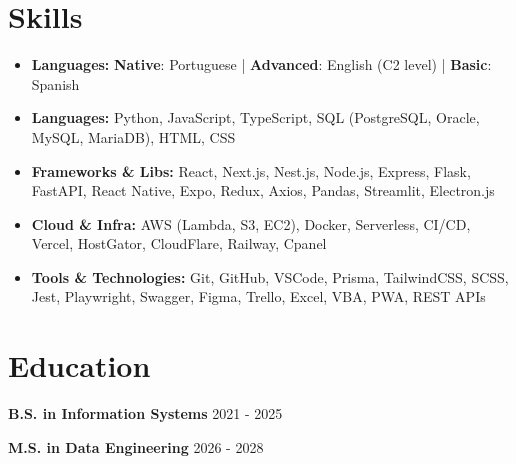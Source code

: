 \documentclass[a4paper,11pt]{article}
\begin{document}
\section*{Skills}
\vspace{0.6em}
\begin{itemize}
\item \textbf{Languages:} \textbf{Native}: Portuguese | \textbf{Advanced}: English (C2 level) | \textbf{Basic}: Spanish
\item \textbf{Languages:} Python, JavaScript, TypeScript, SQL (PostgreSQL, Oracle, MySQL, MariaDB), HTML, CSS
\item \textbf{Frameworks \& Libs:} React, Next.js, Nest.js, Node.js, Express, Flask, FastAPI, React Native, Expo, Redux, Axios, Pandas, Streamlit, Electron.js
\item \textbf{Cloud \& Infra:} AWS (Lambda, S3, EC2), Docker, Serverless, CI/CD, Vercel, HostGator, CloudFlare, Railway, Cpanel
\item \textbf{Tools \& Technologies:} Git, GitHub, VSCode, Prisma, TailwindCSS, SCSS, Jest, Playwright, Swagger, Figma, Trello, Excel, VBA, PWA, REST APIs
\end{itemize}

\section*{Education}
\vspace{0.3em}
\noindent\textbf{B.S. in Information Systems} \hfill {\color{light}\small 2021 - 2025}

\vspace{0.6em}

\noindent\textbf{M.S. in Data Engineering} \hfill {\color{light}\small 2026 - 2028}

\end{document}
